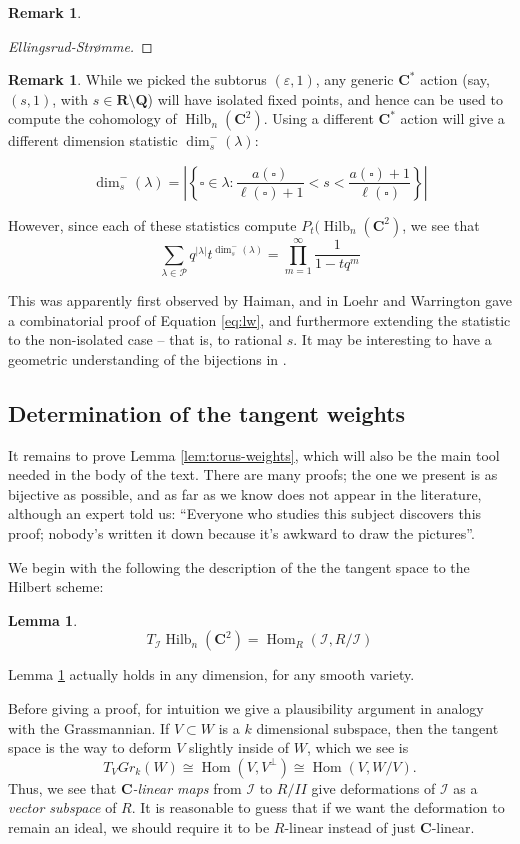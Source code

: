 \documentclass{amsart}[12pt]
\theoremstyle{definition}
\newtheorem{lemma}[dummy]{Lemma}
\newtheorem{remark}[dummy]{Remark}
\newcommand{\C}{\mathbf{C}}
\newcommand{\R}{\mathbf{R}}
\newcommand{\Q}{\mathbf{Q}}
\newcommand{\PP}{\mathcal{P}} %
\newcommand{\II}{\mathcal{I}}
\DeclareMathOperator{\Hilb}{Hilb}
\DeclareMathOperator{\Hom}{Hom}
\begin{document}
\begin{remark}
\begin{proof}[Ellingsrud-Str\o mme]
\end{proof}

\begin{remark}
  While we picked the subtorus $(\varepsilon, 1)$, any generic $\C^*$ action (say, $(s,1)$, with $s\in\R\setminus\Q$) will have isolated fixed points, and hence can be used to compute the cohomology of $\Hilb_n(\C^2)$.  Using a different $\C^*$ action will give a different dimension statistic $\dim_s^-(\lambda)$:

\[ \dim_s^-(\lambda)=\left|\left\{\square\in\lambda : \frac{a(\square)}{\ell(\square)+1}<s<\frac{a(\square)+1}{\ell(\square)}\right\}\right| \]

However, since each of these statistics compute $P_t(\Hilb_n(\C^2)$, we see that
\begin{equation} \label{eq:lw} \sum_{\lambda\in\PP} q^{|\lambda|}t^{\dim_s^-(\lambda)}=\prod_{m=1}^\infty \frac{1}{1-tq^m}
  \end{equation}

This was apparently first observed by Haiman, and in \cite{LW} Loehr and Warrington gave a combinatorial proof of Equation \ref{eq:lw}, and furthermore extending the statistic to the non-isolated case -- that is, to rational $s$.  It may be interesting to have a geometric understanding of the bijections in \cite{LW}.
\end{remark}


\subsection{Determination of the tangent weights}

It remains to prove Lemma \ref{lem:torus-weights}, which will also be the main tool needed in the body of the text.  There are many proofs; the one we present is as bijective as possible, and as far as we know does not appear in the literature, although an expert told us: ``Everyone who studies this subject discovers this proof; nobody's written it down because it's awkward to draw the pictures''.


We begin with the following the description of the the tangent space to the Hilbert scheme:
\begin{lemma} \label{lem:tangent-hom}
$$T_{\II}\Hilb_n(\C^2)=\Hom_R(\II,R/\II)$$
\end{lemma}
Lemma \ref{lem:tangent-hom} actually holds in any dimension, for any smooth variety.

Before giving a proof, for intuition we give a plausibility argument in analogy with the Grassmannian.  If $V\subset W$ is a $k$ dimensional subspace, then the tangent space is the way to deform $V$ slightly inside of $W$, which we see is
\[T_V Gr_k(W)\cong \Hom(V, V^\perp) \cong \Hom(V, W/V).\]
Thus, we see that  \emph{$\C$-linear maps} from $\II$ to $R/II$ give deformations of $\II$ as a \emph{vector subspace} of $R$.  It is reasonable to guess that if we want the deformation to remain an ideal, we should require it to be $R$-linear instead of just $\C$-linear.


\end{remark}
\end{document}
